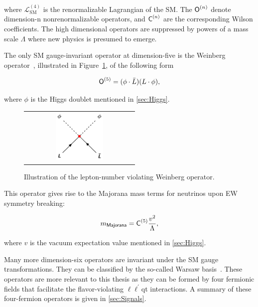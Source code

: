 where $\mathcal{L}_{\text{SM}}^{(4)}$ is the renormalizable Lagrangian of the \ac{SM}. The $\textsf{O}^{(n)}_{}$ denote dimension-n nonrenormalizable operators, and $\textsf{C}^{(n)}_{}$ are the corresponding Wilson coefficients. The high dimensional operators are suppressed by powers of a mass scale $\Lambda$ where new physics is presumed to emerge. 

The only \ac{SM} gauge-invariant operator at dimension-five is the Weinberg operator~\cite{Weinberg:1979sa}, illustrated in Figure~\ref{fig:Dim5}, of the following form

\begin{equation}
\textsf{O}^{(5)}_{}=(\phi\cdot\bar{L})(L\cdot\phi),
\end{equation}

where $\phi$ is the Higgs doublet mentioned in \autoref{sec:Higgs}. 

\begin{figure}[tbh!]
 \begin{center}
 \begin{tabular}{c}
 \includegraphics[width=0.45\textwidth]{figures/Part1/EFT/Dim5}
 \end{tabular}
 \caption{Illustration of the lepton-number violating Weinberg operator.}
 \label{fig:Dim5}
 \end{center}
\end{figure}

This operator gives rise to the Majorana mass terms for neutrinos upon \ac{EW} symmetry breaking:

\begin{equation}
m_{\textsf{Majorana}}=\textsf{C}^{(5)}_{}\frac{v^2}{\mathrm{\Lambda}},
\end{equation}

where $v$ is the vacuum expectation value mentioned in \autoref{sec:Higgs}.

Many more dimension-six operators are invariant under the \ac{SM} gauge transformations. They can be classified by the so-called Warsaw basis~\cite{Grzadkowski:2010es}. These operators are more relevant to this thesis as they can be formed by four fermionic fields that facilitate the flavor-violating $\ell\ell^{\prime}$qt interactions. A summary of these four-fermion operators is given in \autoref{sec:Signals}.